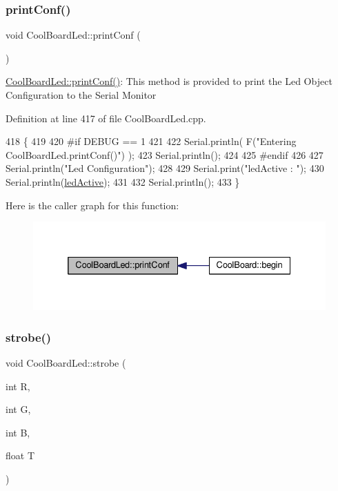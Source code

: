 \subsubsection{\texorpdfstring{print\+Conf()}{printConf()}}
{\footnotesize\ttfamily void Cool\+Board\+Led\+::print\+Conf (\begin{DoxyParamCaption}{ }\end{DoxyParamCaption})}

\hyperlink{class_cool_board_led_a8ed3053a36f0ed4a131f43b5b17efb61}{Cool\+Board\+Led\+::print\+Conf()}\+: This method is provided to print the Led Object Configuration to the Serial Monitor 

Definition at line 417 of file Cool\+Board\+Led.\+cpp.


\begin{DoxyCode}
418 \{
419 
420 \textcolor{preprocessor}{#if DEBUG == 1 }
421 
422     Serial.println( F(\textcolor{stringliteral}{"Entering CoolBoardLed.printConf()"}) );
423     Serial.println();
424 
425 \textcolor{preprocessor}{#endif}
426 
427     Serial.println(\textcolor{stringliteral}{"Led Configuration"});
428 
429     Serial.print(\textcolor{stringliteral}{"ledActive : "});
430     Serial.println(\hyperlink{class_cool_board_led_aadd04d2ecf123247718d77f42fba7f08}{ledActive});
431 
432     Serial.println();   
433 \}
\end{DoxyCode}
Here is the caller graph for this function\+:\nopagebreak
\begin{figure}[H]
\begin{center}
\leavevmode
\includegraphics[width=332pt]{de/dc0/class_cool_board_led_a8ed3053a36f0ed4a131f43b5b17efb61_icgraph}
\end{center}
\end{figure}
\mbox{\label{class_cool_board_led_ad5f0de4c628cbfbf49896042831c64ad}} 
\subsubsection{\texorpdfstring{strobe()}{strobe()}}
{\footnotesize\ttfamily void Cool\+Board\+Led\+::strobe (\begin{DoxyParamCaption}\item[{int}]{R,  }\item[{int}]{G,  }\item[{int}]{B,  }\item[{float}]{T }\end{DoxyParamCaption})}

